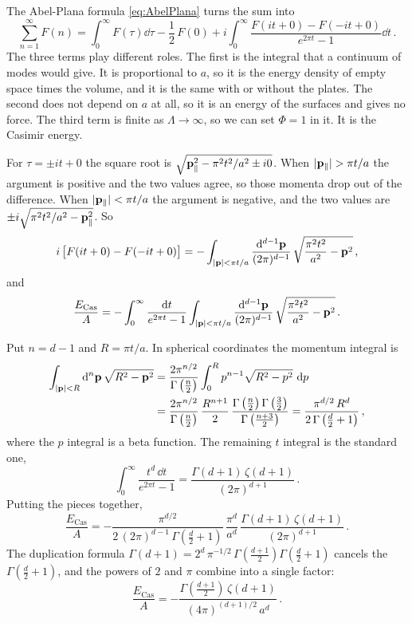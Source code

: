  The Abel-Plana formula \eqref{eq:AbelPlana} turns the sum
into
\[
\sum_{n=1}^\infty F(n)=\int_0^\infty F(\tau)\dd\tau-\frac12\,F(0)
+i\int_0^\infty\frac{F(it+0)-F(-it+0)}{e^{2\pi t}-1}\dd t\,.
\]
The three terms play different roles. The first is the integral that a
continuum of modes would give. It is proportional to $a$, so it is the energy
density of empty space times the volume, and it is the same with or without
the plates. The second does not depend on $a$ at all, so it is an energy of
the surfaces and gives no force. The third term is finite as $\Lambda\to\infty$,
so we can set $\Phi=1$ in it. It is the Casimir energy.

 For $\tau=\pm it+0$ the square root is
$\sqrt{\mathbf{p}_\parallel^2-\pi^2t^2/a^2\pm i0}$. When $|\pp_\parallel|>\pi t/a$ the
argument is positive and the two values agree, so those momenta drop out of
the difference. When $|\mathbf{p}_\parallel|<\pi t/a$ the argument is negative, and the
two values are $\pm i\sqrt{\pi^2t^2/a^2-\mathbf{p}_\parallel^2}$. So
\[
i\,\bigl[F(it+0)-F(-it+0)\bigr]=-\int_{|\mathbf{p}|<\pi t/a}\frac{\mathop{}\!\mathrm{d}^{d-1}\mathbf{p}}{(2\pi)^{d-1}}\,\sqrt{\frac{\pi^2t^2}{a^2}-\mathbf{p}^2}\,,
\]
and
\[
\frac{E_{\text{Cas}}}A=-\int_0^\infty\frac{\mathop{}\!\mathrm{d} t}{e^{2\pi t}-1}\int_{|\mathbf{p}|<\pi t/a}\frac{\mathop{}\!\mathrm{d}^{d-1}\mathbf{p}}{(2\pi)^{d-1}}\,\sqrt{\frac{\pi^2t^2}{a^2}-\mathbf{p}^2}\,.
\]

 Put $n=d-1$ and $R=\pi t/a$. In spherical coordinates
the momentum integral is
\begin{align*}
\int_{|\mathbf{p}|<R}\mathop{}\!\mathrm{d}^n\mathbf{p}\,\sqrt{R^2-\mathbf{p}^2}
&=\frac{2\pi^{n/2}}{\Gamma\left(\frac n2\right)}\int_0^R p^{n-1}\sqrt{R^2-p^2}\,\mathop{}\!\mathrm{d} p\\
&=\frac{2\pi^{n/2}}{\Gamma\left(\frac n2\right)}\,\frac{R^{n+1}}2\,\frac{\Gamma\left(\frac n2\right)\Gamma\left(\frac32\right)}{\Gamma\left(\frac{n+3}2\right)}
=\frac{\pi^{d/2}\,R^d}{2\,\Gamma\left(\frac d2+1\right)}\,,
\end{align*}
where the $p$ integral is a beta function. The remaining $t$ integral is the
standard one,
\[
\int_0^\infty\frac{t^d\,\dd t}{e^{2\pi t}-1}=\frac{\Gamma(d+1)\,\zeta(d+1)}{(2\pi)^{d+1}}\,.
\]
Putting the pieces together,
\[
\frac{E_{\text{Cas}}}A=-\frac{\pi^{d/2}}{2\,(2\pi)^{d-1}\,\Gamma\left(\frac d2+1\right)}\,\frac{\pi^d}{a^d}\,
\frac{\Gamma(d+1)\,\zeta(d+1)}{(2\pi)^{d+1}}\,.
\]
The duplication formula
$\Gamma(d+1)=2^d\,\pi^{-1/2}\,\Gamma\left(\frac{d+1}2\right)\Gamma\left(\frac d2+1\right)$
cancels the $\Gamma\left(\frac d2+1\right)$, and the powers of $2$ and $\pi$
combine into a single factor:
\[
\frac{E_{\text{Cas}}}A=-\frac{\Gamma\left(\frac{d+1}2\right)\,\zeta(d+1)}{(4\pi)^{(d+1)/2}\,a^d}\,.
\]

